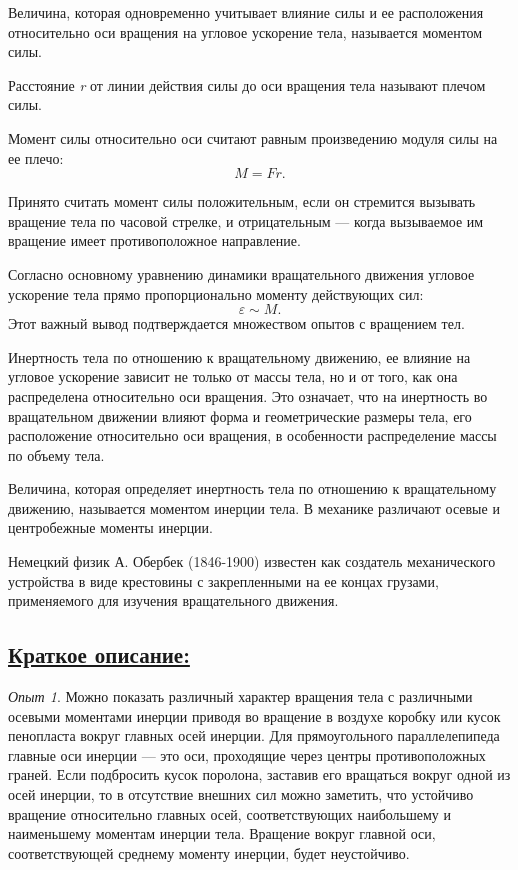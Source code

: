\documentclass[14pt,a4paper,oneside]{extarticle}	%
\begin{document}
	Величина, которая одновременно учитывает влияние силы и ее 
	расположения относительно оси вращения на угловое ускорение 
	тела, называется моментом силы. 
	
	Расстояние \textit{r} от линии действия силы до оси вращения тела называют плечом силы. 
	
	Момент силы относительно оси считают равным произведению модуля силы на ее плечо: $$ M=Fr. $$
	
	Принято считать момент силы положительным, если он стремится вызывать вращение тела по часовой стрелке, и отрицательным — когда вызываемое им вращение имеет противоположное направление. 
	
	Согласно основному уравнению динамики вращательного движения угловое ускорение тела прямо пропорционально моменту действующих сил: $$ \varepsilon \sim M. $$
	Этот важный вывод подтверждается множеством опытов с вращением тел.
	
	Инертность тела по отношению к вращательному движению, ее влияние на угловое ускорение зависит не только от массы тела, но и от того, как она распределена относительно оси вращения. 
	Это означает, что на инертность во вращательном движении влияют форма и геометрические размеры тела, его расположение относительно оси вращения, в особенности распределение массы по объему тела. 
	
	Величина, которая определяет инертность тела по отношению к вращательному движению, называется моментом инерции тела.
	В механике различают осевые и центробежные моменты инерции. 
	
	Немецкий физик А. Обербек (1846-1900) известен как создатель механического устройства в виде крестовины с закрепленными на ее концах грузами, применяемого для изучения вращательного движения.

		\subsection*{\underline{Краткое описание:}}
		
	\textit{Опыт 1}. 
	Можно показать различный характер вращения тела с различными осевыми моментами инерции приводя во вращение в воздухе коробку или кусок пенопласта вокруг главных осей инерции.
	Для прямоугольного параллелепипеда главные оси инерции — это оси, проходящие через центры противоположных граней.
	Если подбросить кусок поролона, заставив его вращаться вокруг одной из осей инерции, то в отсутствие внешних сил можно заметить, что устойчиво вращение относительно главных осей, соответствующих наибольшему и наименьшему моментам инерции тела.
	Вращение вокруг главной оси, соответствующей среднему моменту инерции, будет неустойчиво.
\end{document}
